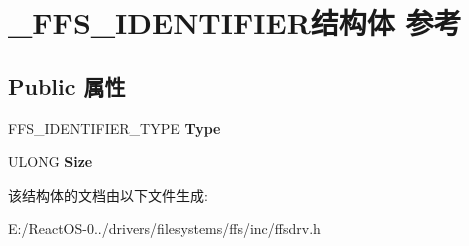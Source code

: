 \hypertarget{struct___f_f_s___i_d_e_n_t_i_f_i_e_r}{}\section{\+\_\+\+F\+F\+S\+\_\+\+I\+D\+E\+N\+T\+I\+F\+I\+E\+R结构体 参考}
\label{struct___f_f_s___i_d_e_n_t_i_f_i_e_r}
\subsection*{Public 属性}
\begin{DoxyCompactItemize}
\item 
\mbox{\label{struct___f_f_s___i_d_e_n_t_i_f_i_e_r_af96021335446335540882ecd9cc00636}} 
F\+F\+S\+\_\+\+I\+D\+E\+N\+T\+I\+F\+I\+E\+R\+\_\+\+T\+Y\+PE {\bfseries Type}
\item 
\mbox{\label{struct___f_f_s___i_d_e_n_t_i_f_i_e_r_a7496a274db14d41fd28487e18d64b53c}} 
U\+L\+O\+NG {\bfseries Size}
\end{DoxyCompactItemize}


该结构体的文档由以下文件生成\+:\begin{DoxyCompactItemize}
\item 
E\+:/\+React\+O\+S-\/0../drivers/filesystems/ffs/inc/ffsdrv.\+h\end{DoxyCompactItemize}
